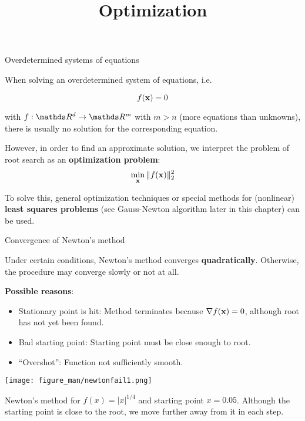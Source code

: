 \documentclass[11pt,compress,t,notes=noshow, xcolor=table]{beamer}
\title{Optimization}
\begin{document}
\sloppy


\begin{vbframe}{Overdetermined systems of equations}

When solving an overdetermined system of equations, i.e.

\vspace*{-0.3cm}
$$
f(\mathbf{x}) = 0
$$

with $f: \R^d \to \R^m$ with $m > n$ (more equations than unknowns), there is usually no solution for the corresponding equation.

\lz

However, in order to find an approximate solution, we interpret the problem of root search as an \textbf{optimization problem}:
$$
\min_{\mathbf{x}}\|f(\mathbf{x})\|_2^2
$$


To solve this, general optimization techniques or special methods for (nonlinear) \textbf{least squares problems} (see Gauss-Newton algorithm later in this chapter) can be used.

\end{vbframe}

\begin{vbframe}{Convergence of Newton's method}

Under certain conditions, Newton's method converges \textbf{quadratically}. Otherwise, the procedure may converge slowly or not at all.

\vspace*{0.2cm}

\textbf{Possible reasons}:

\begin{itemize}
\item Stationary point is hit: Method terminates because $\nabla f(\mathbf{x})= 0$, although root has not yet been found.
\item Bad starting point: Starting point must be close enough to root.
\item \enquote{Overshot}: Function not sufficiently smooth. 
\end{itemize}

\begin{center}
\texttt{[image: figure\_man/newtonfail1.png]} \\
\begin{footnotesize} Newton's method for $f(x) = |x|^{1/4}$ and starting point $x = 0.05$. Although the starting point is close to the root, we move further away from it in each step.\end{footnotesize}
\end{center}

\end{vbframe}

\endlecture
\end{document}
